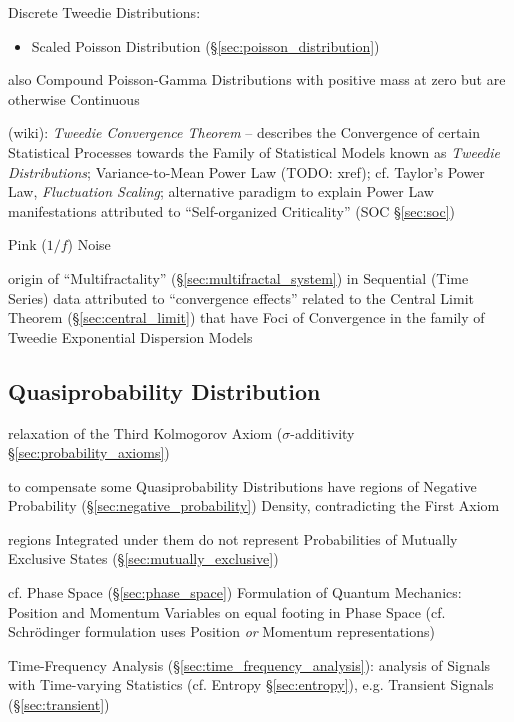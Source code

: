 Discrete Tweedie Distributions:
\begin{itemize}
  \item Scaled Poisson Distribution (\S\ref{sec:poisson_distribution})
\end{itemize}

also Compound Poisson-Gamma Distributions with positive mass at zero but are
otherwise Continuous

(wiki): \emph{Tweedie Convergence Theorem} -- describes the Convergence of
certain Statistical Processes towards the Family of Statistical Models known as
\emph{Tweedie Distributions}; Variance-to-Mean Power Law (TODO: xref); cf.
Taylor's Power Law, \emph{Fluctuation Scaling}; alternative paradigm to explain
Power Law manifestations attributed to ``Self-organized Criticality'' (SOC
\S\ref{sec:soc})

Pink ($1/f$) Noise

\fist origin of ``Multifractality'' (\S\ref{sec:multifractal_system}) in
Sequential (Time Series) data attributed to ``convergence effects'' related to
the Central Limit Theorem (\S\ref{sec:central_limit}) that have Foci of
Convergence in the family of Tweedie Exponential Dispersion Models



\subsection{Quasiprobability Distribution}
\label{sec:quasiprobability_distribution}

relaxation of the Third Kolmogorov Axiom ($\sigma$-additivity
\S\ref{sec:probability_axioms})

to compensate some Quasiprobability Distributions have regions of Negative
Probability (\S\ref{sec:negative_probability}) Density, contradicting the First
Axiom

regions Integrated under them do not represent Probabilities of Mutually
Exclusive States (\S\ref{sec:mutually_exclusive})

cf. Phase Space (\S\ref{sec:phase_space}) Formulation of Quantum Mechanics:
Position and Momentum Variables on equal footing in Phase Space (cf.
Schr\"odinger formulation uses Position \emph{or} Momentum representations)

\fist Time-Frequency Analysis (\S\ref{sec:time_frequency_analysis}): analysis
of Signals with Time-varying Statistics (cf. Entropy \S\ref{sec:entropy}), e.g.
Transient Signals (\S\ref{sec:transient})



